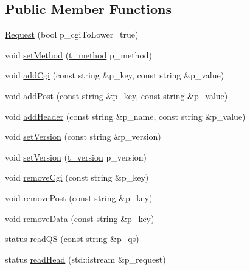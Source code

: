 \subsection*{Public Member Functions}
\begin{DoxyCompactItemize}
\item 
\hyperlink{classxtd_1_1network_1_1http_1_1Request_a6255d0a163700ed3aec8b8e655573208}{Request} (bool p\-\_\-cgi\-To\-Lower=true)
\item 
void \hyperlink{classxtd_1_1network_1_1http_1_1Request_a3ee369c6c2b8888815f1347d9f7df3f0}{set\-Method} (\hyperlink{classxtd_1_1network_1_1http_1_1Request_a789d6d688af4e63cc725542fc7925627}{t\-\_\-method} p\-\_\-method)
\item 
void \hyperlink{classxtd_1_1network_1_1http_1_1Request_a42304776ec9355ab89c6e8e0391f4309}{add\-Cgi} (const string \&p\-\_\-key, const string \&p\-\_\-value)
\item 
void \hyperlink{classxtd_1_1network_1_1http_1_1Request_a463b8876852246bac863584f9dc3d0ae}{add\-Post} (const string \&p\-\_\-key, const string \&p\-\_\-value)
\item 
void \hyperlink{classxtd_1_1network_1_1http_1_1Request_ac7f15d9f25ab85da1569e7718ea6544d}{add\-Header} (const string \&p\-\_\-name, const string \&p\-\_\-value)
\item 
void \hyperlink{classxtd_1_1network_1_1http_1_1Request_a4fc25edc6c133d46f1780a3b8c5a3c4e}{set\-Version} (const string \&p\-\_\-version)
\item 
void \hyperlink{classxtd_1_1network_1_1http_1_1Request_a3a56519771fa2e7af734152a12b56361}{set\-Version} (\hyperlink{classxtd_1_1network_1_1http_1_1Request_ad1842a3667ff0a96222bb69262cda536}{t\-\_\-version} p\-\_\-version)
\item 
void \hyperlink{classxtd_1_1network_1_1http_1_1Request_a2e739ee31fca9fdddc4fa69432405b09}{remove\-Cgi} (const string \&p\-\_\-key)
\item 
void \hyperlink{classxtd_1_1network_1_1http_1_1Request_a69b20f61fbdf1727be7b6eb4623e30d7}{remove\-Post} (const string \&p\-\_\-key)
\item 
void \hyperlink{classxtd_1_1network_1_1http_1_1Request_adbbc4691784a7e7f49e31ffe54b733dd}{remove\-Data} (const string \&p\-\_\-key)
\item 
status \hyperlink{classxtd_1_1network_1_1http_1_1Request_acd61448f2826e30001bf6d9ada90a2a6}{read\-Q\-S} (const string \&p\-\_\-qs)
\item 
status \hyperlink{classxtd_1_1network_1_1http_1_1Request_a1f25a3becd01d0ee957ecd697f178956}{read\-Head} (std\-::istream \&p\-\_\-request)

\end{DoxyCompactItemize}
